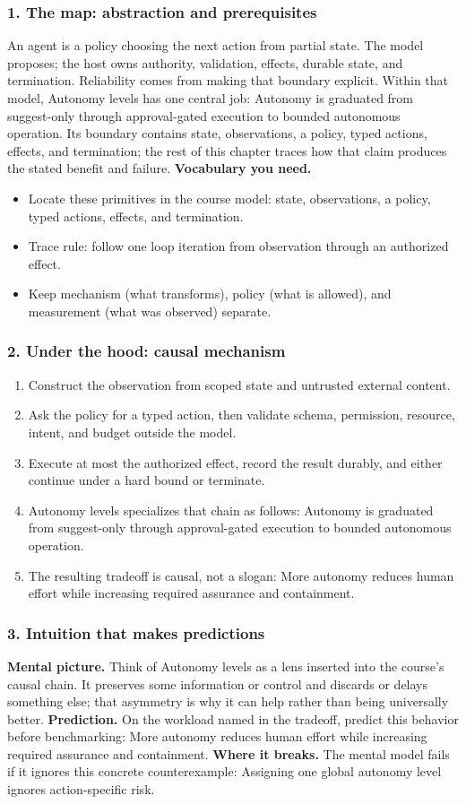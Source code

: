 \subsubsection*{1. The map: abstraction and prerequisites}
An agent is a policy choosing the next action from partial state. The model proposes; the host owns authority, validation, effects, durable state, and termination. Reliability comes from making that boundary explicit.
Within that model, Autonomy levels has one central job: Autonomy is graduated from suggest-only through approval-gated execution to bounded autonomous operation. Its boundary contains state, observations, a policy, typed actions, effects, and termination; the rest of this chapter traces how that claim produces the stated benefit and failure.
\textbf{Vocabulary you need.}\begin{itemize}
\item Locate these primitives in the course model: state, observations, a policy, typed actions, effects, and termination.
\item Trace rule: follow one loop iteration from observation through an authorized effect.
\item Keep mechanism (what transforms), policy (what is allowed), and measurement (what was observed) separate.
\end{itemize}
\subsubsection*{2. Under the hood: causal mechanism}\begin{enumerate}
\item Construct the observation from scoped state and untrusted external content.
\item Ask the policy for a typed action, then validate schema, permission, resource, intent, and budget outside the model.
\item Execute at most the authorized effect, record the result durably, and either continue under a hard bound or terminate.
\item Autonomy levels specializes that chain as follows: Autonomy is graduated from suggest-only through approval-gated execution to bounded autonomous operation.
\item The resulting tradeoff is causal, not a slogan: More autonomy reduces human effort while increasing required assurance and containment.
\end{enumerate}
\subsubsection*{3. Intuition that makes predictions}
\textbf{Mental picture.} Think of Autonomy levels as a lens inserted into the course's causal chain. It preserves some information or control and discards or delays something else; that asymmetry is why it can help rather than being universally better.
\textbf{Prediction.} On the workload named in the tradeoff, predict this behavior before benchmarking: More autonomy reduces human effort while increasing required assurance and containment.
\textbf{Where it breaks.} The mental model fails if it ignores this concrete counterexample: Assigning one global autonomy level ignores action-specific risk.
